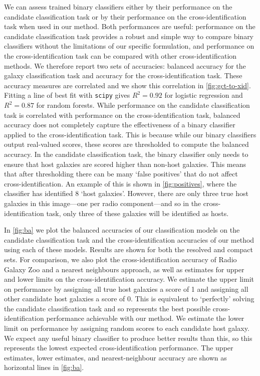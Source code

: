 \documentclass[11pt, a4paper]{book}
\begin{document}
    {We can assess trained binary classifiers either by their performance on
    the candidate classification task or by their performance on the
    cross-identification task when used in our method. Both performances are
    useful: performance on the candidate classification task provides a robust
    and simple way to compare binary classifiers without the limitations of
    our specific formulation, and performance on the cross-identification task
    can be compared with other cross-identification methods. We therefore
    report two sets of accuracies: balanced accuracy for the galaxy
    classification task and accuracy for the cross-identification task. These
    accuracy measures are correlated and we show this correlation in
    \autoref{fig:gct-to-xid}. Fitting a line of best fit with \texttt{scipy}
    gives $R^2 = 0.92$ for logistic regression and $R^2 = 0.87$ for random
    forests. While performance on the candidate classification task is correlated
    with performance on the cross-identification task, balanced accuracy does
    not completely capture the effectiveness of a binary classifier applied to
    the cross-identification task. {This is because while our binary
    classifiers output real-valued scores, these scores are thresholded to
    compute the balanced accuracy}. In the candidate classification
    task, the binary classifier only needs to ensure that host galaxies are
    {scored higher} than non-host galaxies. This means
    {that after thresholding} there can be
    many `false positives' that do not affect cross-identification. An example
    of this is shown in \autoref{fig:positives}, where the classifier has
    identified 8 `host galaxies'. However, there are only three true host
    galaxies in this image---one per radio component---and so in the
    cross-identification task, only three of these galaxies will be identified
    as hosts.}

    In \autoref{fig:ba} we plot {the balanced accuracies of our classification models
    on the candidate classification task and the cross-identification
    accuracies of our method using each of these models. Results are shown for both
    the resolved and compact sets.} For comparison, we also plot the cross-identification accuracy of Radio Galaxy
    Zoo and a nearest neighbours approach, as well as estimates for upper and
    lower limits on the cross-identification accuracy. {We estimate the upper limit on performance by assigning all
    true host galaxies a score of 1 and
    assigning all other candidate host galaxies a score of 0. This
    is equivalent to `perfectly' solving the candidate classification task and so
    represents the best possible cross-identification performance achievable
    with our method. We estimate the lower limit on performance by {
    assigning random scores to each candidate host galaxy}. We expect any
    useful binary classifier to produce better
    results than this, so this represents the lowest expected
    cross-identification performance.} The upper estimates, lower estimates,
    and nearest-neighbour accuracy are shown as horizontal lines in
    \autoref{fig:ba}.
\end{document}
